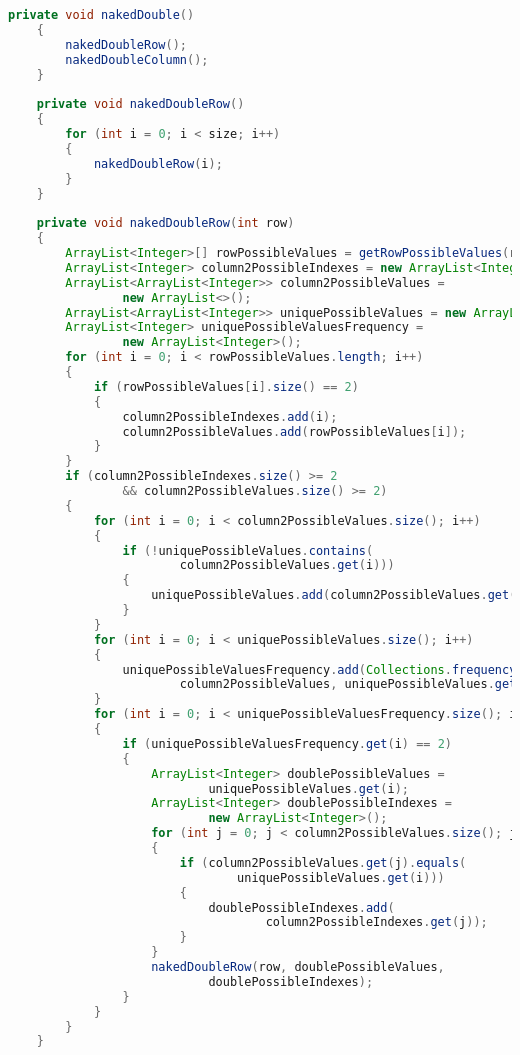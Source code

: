 \begin{lstlisting}[language=Java,basicstyle=\tiny,caption=SolverRuleBased.java]
    private void nakedDouble()
    {
        nakedDoubleRow();
        nakedDoubleColumn();
    }
    
    private void nakedDoubleRow()
    {
        for (int i = 0; i < size; i++)
        {
            nakedDoubleRow(i);
        }
    }
    
    private void nakedDoubleRow(int row)
    {
        ArrayList<Integer>[] rowPossibleValues = getRowPossibleValues(row);
        ArrayList<Integer> column2PossibleIndexes = new ArrayList<Integer>();
        ArrayList<ArrayList<Integer>> column2PossibleValues = 
                new ArrayList<>();
        ArrayList<ArrayList<Integer>> uniquePossibleValues = new ArrayList<>();
        ArrayList<Integer> uniquePossibleValuesFrequency = 
                new ArrayList<Integer>();
        for (int i = 0; i < rowPossibleValues.length; i++)
        {
            if (rowPossibleValues[i].size() == 2)
            {
                column2PossibleIndexes.add(i);
                column2PossibleValues.add(rowPossibleValues[i]);
            }
        }
        if (column2PossibleIndexes.size() >= 2
                && column2PossibleValues.size() >= 2)
        {
            for (int i = 0; i < column2PossibleValues.size(); i++)
            {
                if (!uniquePossibleValues.contains(
                        column2PossibleValues.get(i)))
                {
                    uniquePossibleValues.add(column2PossibleValues.get(i));
                }
            }
            for (int i = 0; i < uniquePossibleValues.size(); i++)
            {
                uniquePossibleValuesFrequency.add(Collections.frequency(
                        column2PossibleValues, uniquePossibleValues.get(i)));
            }
            for (int i = 0; i < uniquePossibleValuesFrequency.size(); i++)
            {
                if (uniquePossibleValuesFrequency.get(i) == 2)
                {
                    ArrayList<Integer> doublePossibleValues = 
                            uniquePossibleValues.get(i);
                    ArrayList<Integer> doublePossibleIndexes = 
                            new ArrayList<Integer>();
                    for (int j = 0; j < column2PossibleValues.size(); j++)
                    {
                        if (column2PossibleValues.get(j).equals(
                                uniquePossibleValues.get(i)))
                        {
                            doublePossibleIndexes.add(
                                    column2PossibleIndexes.get(j));
                        }
                    }
                    nakedDoubleRow(row, doublePossibleValues, 
                            doublePossibleIndexes);
                }
            }
        }
    }
    

\end{lstlisting}
